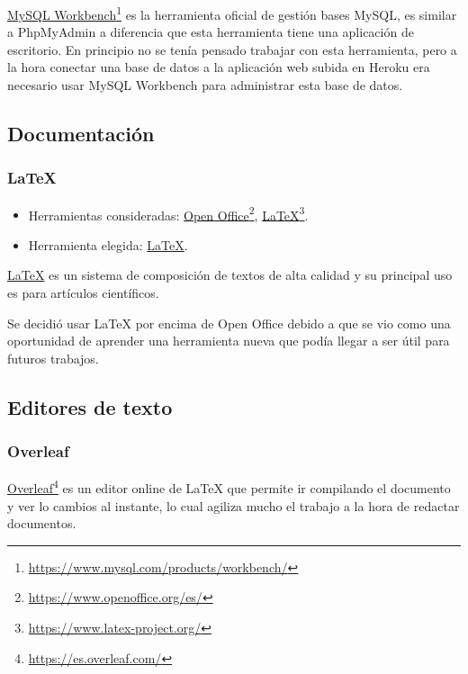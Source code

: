 \href{https://www.phpmyadmin.net/}{MySQL Workbench}\footnote{\href{https://www.mysql.com/products/workbench/}{https://www.mysql.com/products/workbench/}} es la herramienta oficial de gestión bases MySQL, es similar a PhpMyAdmin a diferencia que esta herramienta tiene una aplicación de escritorio. En principio no se tenía pensado trabajar con esta herramienta, pero a la hora conectar una base de datos a la aplicación web subida en Heroku era necesario usar MySQL Workbench para administrar esta base de datos.

\subsection{Documentación}

\subsubsection{\LaTeX}
\begin{itemize}
    \item Herramientas consideradas: \href{https://www.openoffice.org/es/}{Open Office}\footnote{\href{https://www.openoffice.org/es/}{https://www.openoffice.org/es/}}, \href{https://www.latex-project.org/}{\LaTeX}\footnote{\label{latexfoot}\href{https://www.latex-project.org/}{https://www.latex-project.org/}}.
	\item Herramienta elegida: \href{https://www.latex-project.org/}{\LaTeX}.
\end{itemize}

\href{https://www.latex-project.org/}{\LaTeX} es un sistema de composición de textos de alta calidad y su principal uso es para artículos científicos.

Se decidió usar \LaTeX{} por encima de Open Office debido a que se vio como una oportunidad de aprender una herramienta nueva que podía llegar a ser útil para futuros trabajos.

\subsection{Editores de texto}

\subsubsection{Overleaf}

\href{https://es.overleaf.com/}{Overleaf}\footnote{\href{https://es.overleaf.com/}{https://es.overleaf.com/}} es un editor online de \LaTeX{} que permite ir compilando el documento y ver lo cambios al instante, lo cual agiliza mucho el trabajo a la hora de redactar documentos.

